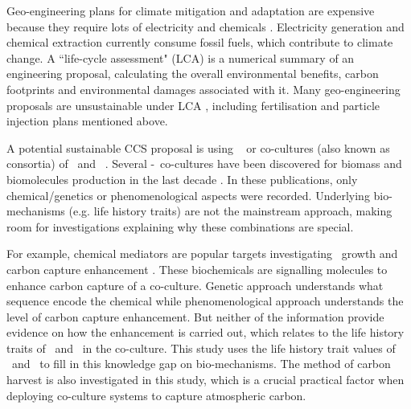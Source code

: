 \documentclass[../thesis.tex]{subfiles} %
\begin{document}
Geo-engineering plans for climate mitigation and adaptation are expensive because they require lots of electricity and chemicals \autocite{boyd2008ranking,boyd2008implications,mcclellan2012cost}.  Electricity generation and chemical extraction currently consume fossil fuels, which contribute to climate change.  A ``life-cycle assessment" (LCA) is a numerical summary of an engineering proposal, calculating the overall environmental benefits, carbon footprints and environmental damages associated with it.  Many geo-engineering proposals are unsustainable under LCA \autocite{abdussalam2020green}, including fertilisation and particle injection plans mentioned above.

A potential sustainable CCS proposal is using \phy\ \autocite{farrelly2013carbon} or co-cultures (also known as consortia) of \phy\ and \bac\ \autocite{fuentes2016impact}.  Several \phy-\bac\ co-cultures have been discovered for biomass and biomolecules production in the last decade \autocite{fuentes2016impact,santos2014microalgal}.  In these publications, only chemical/genetics \autocite{amin2009photolysis,durham2015cryptic,leyva2014accumulation,rivas2010interactions,seyedsayamdost2011roseobacticides} or phenomenological \autocite{choix2012enhanced1,choix2012enhanced2,kazamia2012mutualistic,santos2014microalgal} aspects were recorded.  Underlying bio-mechanisms (e.g. life history traits) are not the mainstream approach, making room for investigations explaining why these combinations are special.

For example, chemical mediators are popular targets investigating \phy\ growth and carbon capture enhancement \autocite{fuentes2016impact}.  These biochemicals are signalling molecules to enhance carbon capture of a co-culture.  Genetic approach understands what sequence encode the chemical while phenomenological approach understands the level of carbon capture enhancement.  But neither of the information provide evidence on how the enhancement is carried out, which relates to the life history traits of \phy\ and \bacm\ in the co-culture.  This study uses the life history trait values of \phy\ and \bac\ to fill in this knowledge gap on bio-mechanisms.  The method of carbon harvest is also investigated in this study, which is a crucial practical factor when deploying co-culture systems to capture atmospheric carbon.
\end{document}
